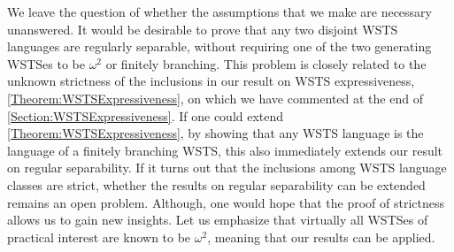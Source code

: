 \documentclass[../../diss.tex]{subfiles}
\begin{document}
We leave the question of whether the assumptions that we make are necessary unanswered.
It would be desirable to prove that any two disjoint WSTS languages are regularly separable, without requiring one of the two generating WSTSes to be $\omega^2$ or finitely branching.
This problem is closely related to the unknown strictness of the inclusions in our result on WSTS expressiveness, \cref{Theorem:WSTSExpressiveness}, on which we have commented at the end of \cref{Section:WSTSExpressiveness}.
If one could extend \cref{Theorem:WSTSExpressiveness}, \eg by showing that any WSTS language is the language of a finitely branching WSTS, this also immediately extends our result on regular separability.
If it turns out that the inclusions among WSTS language classes are strict, whether the results on regular separability can be extended remains an open problem.
Although, one would hope that the proof of strictness allows us to gain new insights.
Let us emphasize that virtually all WSTSes of practical interest are known to be $\omega^2$, meaning that our results can be applied.
\end{document}
